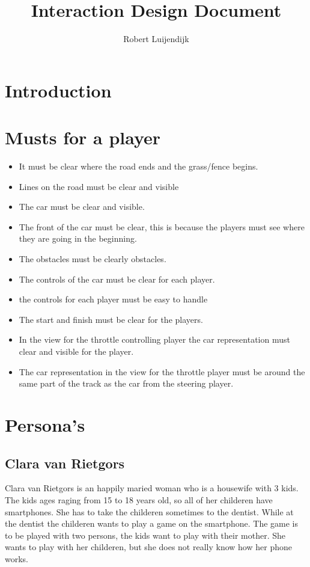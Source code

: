 \documentclass{article}
\title{Interaction Design Document}
\author{Robert Luijendijk}
\date{}
\begin{document}
\maketitle

\section{Introduction}

\section{Musts for a player}
\begin{itemize}
\item It must be clear where the road ends and the grass/fence begins.
\item Lines on the road must be clear and visible
\item The car must be clear and visible.
\item The front of the car must be clear, this is because the players must see where they are going in the beginning.
\item The obstacles must be clearly obstacles.
\item The controls of the car must be clear for each player.
\item the controls for each player must be easy to handle
\item The start and finish must be clear for the players.
\item In the view for the throttle controlling player the car representation must clear and visible for the player.
\item The car representation in the view for the throttle player must be around the same part of the track as the car from the steering player.
\end{itemize}

\section{Persona's}
\subsection{Clara van Rietgors}
Clara van Rietgors is an happily maried woman who is a housewife with 3 kids. The kids ages raging from 15 to 18 years old, so all of her childeren have smartphones. She has to take the childeren sometimes to the dentist. While at the dentist the childeren wants to play a game on the smartphone. The game is to be played with two persons, the kids want to play with their mother. She wants to play with her childeren, but she does not really know how her phone works. 
\end{document}
